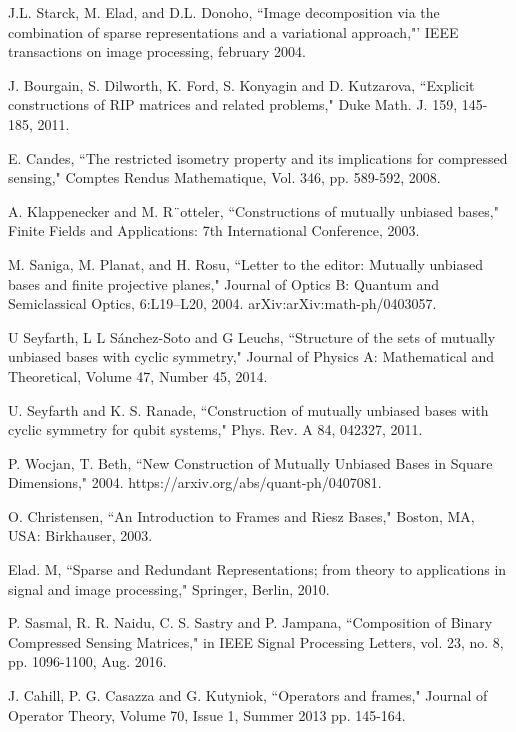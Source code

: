 \documentclass{IEEEtran}
\begin{document}
\begin{thebibliography}{99}
J.L. Starck, M. Elad, and D.L. Donoho, ``Image decomposition via the combination of sparse representations and a variational approach,"'
IEEE transactions on image processing, february 2004.

   J. Bourgain, S. Dilworth, K. Ford, S. Konyagin and D. Kutzarova, ``Explicit constructions of RIP matrices and related problems," Duke Math. J. 159, 145-185, 2011.


  E. Candes, ``The restricted isometry property and its implications for compressed sensing," Comptes Rendus Mathematique, Vol. 346, pp. 589-592, 2008.
 





A. Klappenecker and M. R¨otteler, ``Constructions of mutually unbiased bases," Finite Fields and Applications: 7th International Conference, 2003. 

M. Saniga, M. Planat, and H. Rosu, ``Letter to the editor: Mutually
unbiased bases and finite projective planes," Journal of Optics B: Quantum and Semiclassical Optics, 6:L19–L20, 2004. arXiv:arXiv:math-ph/0403057.
 
 U Seyfarth, L L Sánchez-Soto and G Leuchs, ``Structure of the sets of mutually unbiased bases with cyclic symmetry," Journal of Physics A: Mathematical and Theoretical, Volume 47, Number 45, 2014. 

U. Seyfarth and K. S. Ranade, ``Construction of mutually unbiased bases with cyclic symmetry for qubit systems," Phys. Rev. A 84, 042327, 2011.

P. Wocjan, T. Beth, ``New Construction of Mutually Unbiased Bases in Square Dimensions," 2004. https://arxiv.org/abs/quant-ph/0407081.

 O. Christensen, ``An Introduction to Frames and Riesz Bases," Boston, MA, USA: Birkhauser, 2003.



Elad. M, ``Sparse and Redundant Representations; from theory to applications in signal and image processing," Springer, Berlin, 2010.

P. Sasmal, R. R. Naidu, C. S. Sastry and P. Jampana, ``Composition of Binary Compressed Sensing Matrices," in IEEE Signal Processing Letters, vol. 23, no. 8, pp. 1096-1100, Aug. 2016.
  
J. Cahill, P. G. Casazza and G. Kutyniok, ``Operators and frames," Journal of Operator Theory, Volume 70, Issue 1, Summer 2013  pp. 145-164.	


\end{thebibliography}
\end{document}
